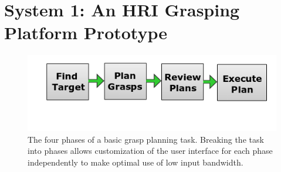 \section*{System 1: An HRI Grasping Platform Prototype}
\setcounter{subsection}{0}
\label{sec:pipeline_1}
\begin{figure}
	\centering
	\includegraphics[width=.8\columnwidth]{images_4/overview_pipeline.png}
	\caption{The four phases of a basic grasp planning task. Breaking the task into phases allows customization of the user interface for each phase independently to make optimal use of low input bandwidth.}
	\label{fig:overview_pipeline}
\end{figure}

